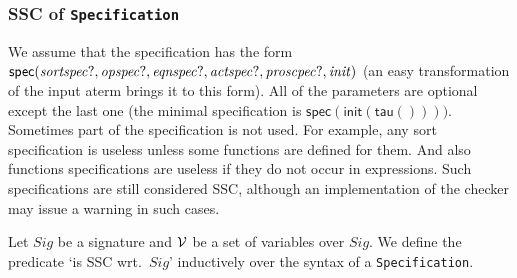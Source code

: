 \documentclass[fleqn,a4paper,dvips]{article}
\newcommand{\aterm}[1]{\mathsf{#1}}
\newcommand{\NV}{{\cal V}}
\begin{document}
\subsubsection{SSC of \texttt{Specification}}
We assume that the specification has the form 
$\aterm{spec}(\nm{sortspec?},\nm{opspec?},\nm{eqnspec?},\nm{actspec?},\nm{proscpec?},\nm{init})$
(an easy transformation of the input aterm brings it to this form).
All of the parameters are optional except the last one (the minimal specification is 
$\aterm{spec}(\aterm{init}(\aterm{tau}())))$.
Sometimes part of the specification is not used. For example, any sort specification is useless 
unless some functions are defined for them. And also functions specifications are useless if they do not
occur in expressions. Such specifications are still considered SSC, although an implementation of the checker 
may issue a warning in such cases.

Let $Sig$ be a signature and $\NV$ be a set of variables over $Sig$. We
define the predicate `is SSC wrt.\ $Sig$'
inductively over the syntax of a {\tt Specification}.
\end{document}
